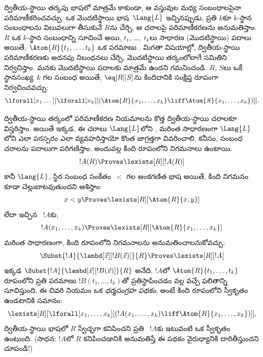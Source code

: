 \documentclass[../../../include/open-logic-section]{subfiles}
\begin{document}


ద్వితీయ-స్థాయి తర్కపు భాషలో  మాత్రమే కాకుండా, ఆ
 వస్తువుల మధ్య సంబంధాలపైనా పరిమాణీకరించవచ్చు. ఒక మొదటిస్థాయి
భాష~$\Lang{L}$ ఇచ్చినప్పుడు, ప్రతి $k$కూ $k$-స్థాన సంబంధాలను విలువలుగా తీసుకునే
 $R$ను చేర్చి, ఆ చరాలపై పరిమాణీకరణను అనుమతిస్తాం. $R$ ఒక
$k$-స్థాన సంబంధాన్ని సూచించే  అయి, $t_1$, \dots,~$t_k$లు సాధారణ
(మొదటిస్థాయి) పదాలు అయితే, $\Atom{R}{t_1,\dots,t_k}$ ఒక పరమాణు
. మిగతా విషయాల్లో, ద్వితీయ-స్థాయి పరిమాణీకరణకు అదనపు
నిబంధనలు చేర్చి, మొదటిస్థాయి తర్కంలోలాగే  సమితిని
నిర్వచిస్తాం. మనకు మొదటిస్థాయి పదాలకు మాత్రమే  ఉందని
గమనించండి. $R$, $S$లు ఒకే స్థానసంఖ్య~$k$ గల సంబంధ  అయితే,
$\eq[R][S]$ను కిందిదానికి సంక్షిప్త రూపంగా నిర్వచించవచ్చు:
\[
\lforall[x_1 \dots][\lforall[x_k][(\Atom{R}{x_1, \dots, x_k} \liff
  \Atom{S}{x_1, \dots, x_k})]].
\]

ద్వితీయ-స్థాయి తర్కంలో పరిమాణీకరణ నియమాలను కొత్త ద్వితీయ-స్థాయి
చరాలకూ విస్తరిస్తాం. అయితే ఇక్కడ, ఈ చరాలు $\Lang{L}$లోని
, మరింత సాధారణంగా $\Lang{L}$లోని  ఎలా
పరస్పరం ఎలా వ్యవహరిస్తాయో కొంత జాగ్రత్తగా వివరించాలి. కనీసం, సంబంధ చరాలను
పదాలుగా పరిగణిస్తాం. అందువల్ల కింది రూపంలోని నిగమనాలు ఉంటాయి.
\[
!A(R) \Proves \lexists[R][!A(R)]
\]
కానీ $\Lang{L}$, స్థిర సంబంధ సంకేతం~$<$ గల అంకగణిత భాష అయితే, కింది
నిగమనం కూడా చెల్లుబాటవుతుందని ఆశిస్తాం:
\[
x < y \Proves \lexists[R][\Atom{R}{x,y}]
\]
లేదా ఇచ్చిన ~$!A$కు,
\[
!A(x_1, \dots, x_k) \Proves \lexists[R][\Atom{R}{x_1,\dots,x_k}]
\]
మరింత సాధారణంగా, కింది రూపంలోని నిగమనాలను అనుమతించాలనుకోవచ్చు:
\[
\Subst{!A}{\lambd[\vec x][!B(\vec x)]}{R} \Proves
\lexists[R][!A]
\]
ఇక్కడ $\Subst{!A}{\lambd[\vec x][!B(\vec x)]}{R}$ అనేది, $!A$లో
$\Atom{R}{t_1,\dots,t_k}$ రూపంలోని ప్రతి పరమాణు 
$!B(t_1, \dots, t_k)$తో ప్రతిస్థాపించడం వల్ల వచ్చే ఫలితాన్ని
సూచిస్తుంది. ఈ చివరి నియమం ఒక {\em ధర్మసంగ్రహ పథకం}, అంటే కింది
రూపంలోని స్వీకృతం ఉండటానికి సమానం:
\[
\lexists[R][\lforall[x_1, \dots, x_k][(!A(x_1, \dots, x_k) \liff
\Atom{R}{x_1, \dots, x_k})]],
\]
ద్వితీయ-స్థాయి భాషలో $R$ స్వేచ్ఛగా కనిపించని ప్రతి ~$!A$కు
ఇటువంటి ఒక స్వీకృతం ఉంటుంది. (సాధన: $!A$లో $R$ కనిపించడానికి అనుమతిస్తే ఈ
పథకం వైరుధ్యానికి దారితీస్తుందని చూపండి!)
\end{document}
